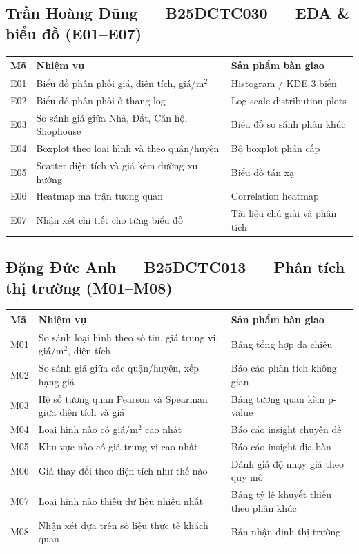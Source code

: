 \documentclass[10pt,a4paper]{article}
\newcommand{\mem}[1]{\subsection*{#1}\vspace{-2pt}}
\begin{document}
\mem{Trần Hoàng Dũng --- B25DCTC030 --- EDA \& biểu đồ (E01--E07)}
\begin{longtable}{@{}p{.9cm}p{8.3cm}p{6.2cm}@{}}
\toprule\textbf{Mã} & \textbf{Nhiệm vụ} & \textbf{Sản phẩm bàn giao}\\\midrule\endhead
E01 & Biểu đồ phân phối giá, diện tích, giá/m$^2$ & Histogram / KDE 3 biến\\
E02 & Biểu đồ phân phối ở thang log & Log-scale distribution plots\\
E03 & So sánh giá giữa Nhà, Đất, Căn hộ, Shophouse & Biểu đồ so sánh phân khúc\\
E04 & Boxplot theo loại hình và theo quận/huyện & Bộ boxplot phân cấp\\
E05 & Scatter diện tích và giá kèm đường xu hướng & Biểu đồ tán xạ\\
E06 & Heatmap ma trận tương quan & Correlation heatmap\\
E07 & Nhận xét chi tiết cho từng biểu đồ & Tài liệu chú giải và phân tích\\\bottomrule
\end{longtable}

\mem{Đặng Đức Anh --- B25DCTC013 --- Phân tích thị trường (M01--M08)}
\begin{longtable}{@{}p{.9cm}p{8.3cm}p{6.2cm}@{}}
\toprule\textbf{Mã} & \textbf{Nhiệm vụ} & \textbf{Sản phẩm bàn giao}\\\midrule\endhead
M01 & So sánh loại hình theo số tin, giá trung vị, giá/m$^2$, diện tích & Bảng tổng hợp đa chiều\\
M02 & So sánh giá giữa các quận/huyện, xếp hạng giá & Báo cáo phân tích không gian\\
M03 & Hệ số tương quan Pearson và Spearman giữa diện tích và giá & Bảng tương quan kèm p-value\\
M04 & Loại hình nào có giá/m$^2$ cao nhất & Báo cáo insight chuyên đề\\
M05 & Khu vực nào có giá trung vị cao nhất & Báo cáo insight địa bàn\\
M06 & Giá thay đổi theo diện tích như thế nào & Đánh giá độ nhạy giá theo quy mô\\
M07 & Loại hình nào thiếu dữ liệu nhiều nhất & Bảng tỷ lệ khuyết thiếu theo phân khúc\\
M08 & Nhận xét dựa trên số liệu thực tế khách quan & Bản nhận định thị trường\\\bottomrule
\end{longtable}
\end{document}
